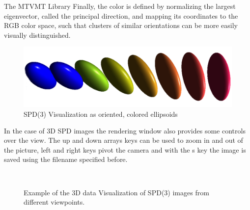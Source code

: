 \begin{chapter}{The MTVMT Library}
Finally, the color is defined by normalizing the largest eigenvector, called the principal direction, and mapping its coordinates to the RGB color space, such that clusters of
similar orientations can be more easily visually distinguished.

\begin{figure}[h!]
        \centering
	    \includegraphics[width=0.8\linewidth]{./figures/library/ellipsoids.pdf}
	    \caption[SPD(3) ellipsoid visualization]{SPD(3) Visualization as oriented, colored ellipsoids}
	\label{fig:ellipsoid_visualization}
\end{figure}

In the case of 3D SPD images the rendering window also provides some controls over the view. The up and down arrays keys can be used to zoom in and out of the picture, left and right keys
pivot the camera and with the s key the image is saved using the filename specified before.
\begin{figure}[h!]
    \centering
    \\
    \caption[3D SPD(3) Volume Visualization of a helix]{Example of the 3D data Visualization of SPD(3) images from different viewpoints.
	\label{fig:helix}
    }
\end{figure}


\end{chapter}
